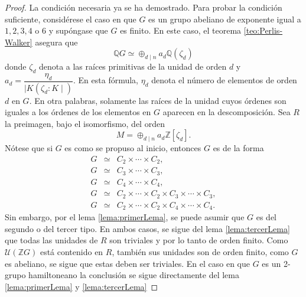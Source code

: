 \begin{proof}
La condición necesaria ya se ha demostrado. Para probar la condición suficiente, considérese el caso en que $G$ es un grupo abeliano de exponente igual a $1,2,3,4$ o $6$ y supóngase que $G$ es finito. En este caso, el teorema \ref{teo:Perlis-Walker} asegura que \[ \mathds{Q}G \simeq \oplus_{d \mid n}a_d\mathds{Q}(\zeta_d)  \] donde $\zeta_d$ denota a las raíces primitivas de la unidad de orden $d$ y $a_d = \dfrac{\eta_d}{\mid K(\zeta_d : K \mid)}$. En esta fórmula, $\eta_d$ denota el número de elementos de orden $d$ en $G$. En otra palabras, solamente las raíces de la unidad cuyos órdenes son iguales a los órdenes de los elementos en $G$ aparecen en la descomposición.
Sea $R$ la preimagen, bajo el isomorfismo, del orden \[ M = \oplus_{d \mid n}a_d \mathds{Z}[\zeta_d].\] Nótese que si $G$ es como se propuso al inicio, entonces $G$ es de la forma 
\begin{eqnarray*}
G &\simeq& C_2 \times \cdots \times C_2, \\
G &\simeq& C_3 \times \cdots \times C_3, \\
G &\simeq& C_4 \times \cdots \times C_4,  \\
G &\simeq& C_2 \times \cdots \times C_2 \times C_3 \times \cdots \times C_3, \\
G &\simeq& C_2 \times \cdots \times C_2 \times C_4 \times \cdots \times C_4.
\end{eqnarray*}
Sin embargo, por el lema \ref{lema:primerLema}, se puede asumir que $G$ es del segundo o del tercer tipo. En ambos casos, se sigue del lema \ref{lema:tercerLema} que todas las unidades de $R$ son triviales y por lo tanto de orden finito. 
Como $\mathcal{U}(\mathds{Z}G)$ está contenido en $R$, también sus unidades son de orden finito, como $G$ es abeliano, se sigue que estas deben ser triviales.
En el caso en que $G$ es un 2-grupo hamiltoneano la conclusión se sigue directamente del lema \ref{lema:primerLema} y \ref{lema:tercerLema}
\end{proof}
